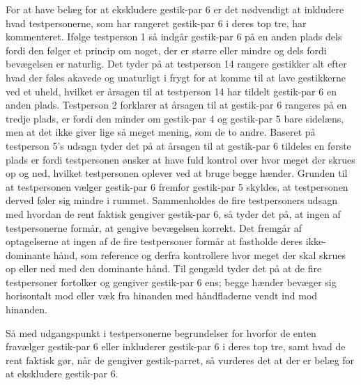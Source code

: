 For at have belæg for at ekskludere gestik-par 6 er det nødvendigt at inkludere hvad testpersonerne, som har rangeret gestik-par 6 i deres top tre, har kommenteret. Ifølge testperson 1 så indgår gestik-par 6 på en anden plads dels fordi den følger et princip om noget, der er større eller mindre og dels fordi bevægelsen er naturlig. Det tyder på at testperson 14 rangere gestikker alt efter hvad der føles akavede og unaturligt i frygt for at komme til at lave gestikkerne ved et uheld, hvilket er årsagen til at testperson 14 har tildelt gestik-par 6 en anden plads. Testperson 2 forklarer at årsagen til at gestik-par 6 rangeres på en tredje plads, er fordi den minder om gestik-par 4 og gestik-par 5 bare sidelæns, men at det ikke giver lige så meget mening, som de to andre. Baseret på testperson 5's udsagn tyder det på at årsagen til at gestik-par 6 tildeles en første plads er fordi testpersonen ønsker at have fuld kontrol over hvor meget der skrues op og ned, hvilket testpersonen oplever ved at bruge begge hænder. Grunden til at testpersonen vælger gestik-par 6 fremfor gestik-par 5 skyldes, at testpersonen derved føler sig mindre i rummet. Sammenholdes de fire testpersoners udsagn med hvordan de rent faktisk gengiver gestik-par 6, så tyder det på, at ingen af testpersonerne formår, at gengive bevægelsen korrekt. Det fremgår af optagelserne at ingen af de fire testpersoner formår at fastholde deres ikke-dominante hånd, som reference og derfra kontrollere hvor meget der skal skrues op eller ned med den dominante hånd. Til gengæld tyder det på	 at de fire testpersoner fortolker og gengiver gestik-par 6 ens; begge hænder bevæger sig horisontalt mod eller væk fra hinanden med håndfladerne vendt ind mod hinanden. 

Så med udgangspunkt i testpersonerne begrundelser for hvorfor de enten fravælger gestik-par 6 eller inkluderer gestik-par 6 i deres top tre, samt hvad de rent faktisk gør, når de gengiver gestik-parret, så vurderes det at der er belæg for at ekskludere gestik-par 6.  





